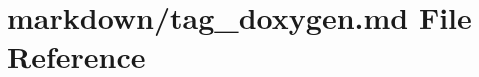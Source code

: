 \hypertarget{tag__doxygen_8md}{}\section{markdown/tag\+\_\+doxygen.md File Reference}
\label{tag__doxygen_8md}
